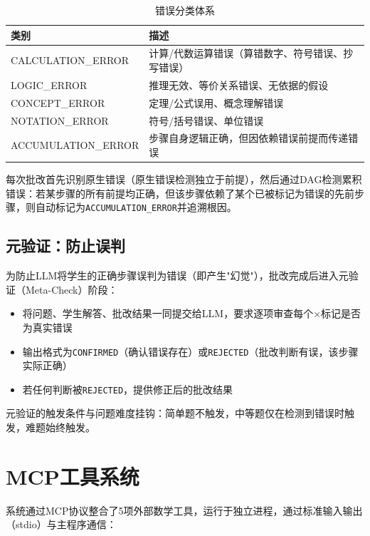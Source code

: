 \documentclass[12pt,a4paper]{ctexart}
\begin{document}
\begin{table}[H]
\centering
\caption{错误分类体系}
\begin{tabular}{@{}lp{9cm}@{}}
\toprule
\textbf{类别} & \textbf{描述} \\
\midrule
CALCULATION\_ERROR & 计算/代数运算错误（算错数字、符号错误、抄写错误） \\
LOGIC\_ERROR & 推理无效、等价关系错误、无依据的假设 \\
CONCEPT\_ERROR & 定理/公式误用、概念理解错误 \\
NOTATION\_ERROR & 符号/括号错误、单位错误 \\
ACCUMULATION\_ERROR & 步骤自身逻辑正确，但因依赖错误前提而传递错误 \\
\bottomrule
\end{tabular}
\end{table}

每次批改首先识别原生错误（原生错误检测独立于前提），然后通过DAG检测累积错误：若某步骤的所有前提均正确，但该步骤依赖了某个已被标记为错误的先前步骤，则自动标记为\verb|ACCUMULATION_ERROR|并追溯根因。

\subsection{元验证：防止误判}

为防止LLM将学生的正确步骤误判为错误（即产生"幻觉"），批改完成后进入元验证（Meta-Check）阶段：

\begin{itemize}[nosep]
  \item 将问题、学生解答、批改结果一同提交给LLM，要求逐项审查每个×标记是否为真实错误
  \item 输出格式为\verb|CONFIRMED|（确认错误存在）或\verb|REJECTED|（批改判断有误，该步骤实际正确）
  \item 若任何判断被\verb|REJECTED|，提供修正后的批改结果
\end{itemize}

元验证的触发条件与问题难度挂钩：简单题不触发，中等题仅在检测到错误时触发，难题始终触发。

\section{MCP工具系统}

系统通过MCP协议整合了5项外部数学工具，运行于独立进程，通过标准输入输出（stdio）与主程序通信：
\end{document}
